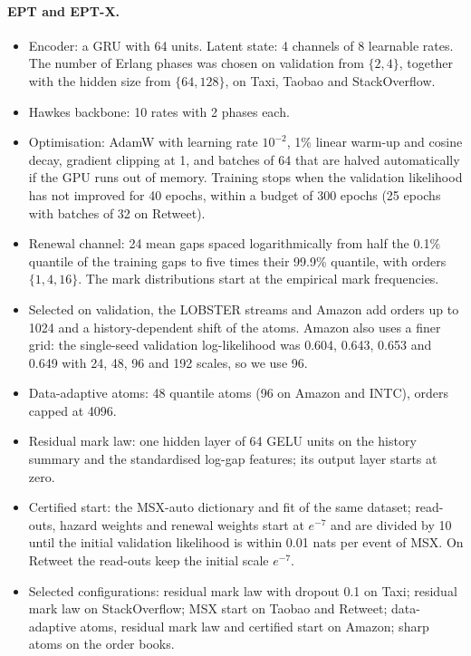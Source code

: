 \paragraph{EPT and EPT-X.}
\begin{itemize}
\item Encoder: a GRU with 64 units. Latent state: 4 channels of 8 learnable rates. The number of
Erlang phases was chosen on validation from $\{2,4\}$, together with the hidden size from
$\{64,128\}$, on Taxi, Taobao and StackOverflow.
\item Hawkes backbone: 10 rates with 2 phases each.
\item Optimisation: AdamW \citep{loshchilov2019decoupled} with learning rate $10^{-2}$, 1\% linear
warm-up and cosine decay, gradient clipping at 1, and batches of 64 that are halved automatically
if the GPU runs out of memory. Training stops when the validation likelihood has not improved for
40 epochs, within a budget of 300 epochs (25 epochs with batches of 32 on Retweet).
\item Renewal channel: 24 mean gaps spaced logarithmically from half the 0.1\% quantile of the
training gaps to five times their 99.9\% quantile, with orders $\{1,4,16\}$. The mark
distributions start at the empirical mark frequencies.
\item Selected on validation, the LOBSTER streams and Amazon add orders up to 1024 and a
history-dependent shift of the atoms. Amazon also uses a finer grid: the single-seed validation
log-likelihood was 0.604, 0.643, 0.653 and 0.649 with 24, 48, 96 and 192 scales, so we use 96.
\item Data-adaptive atoms: 48 quantile atoms (96 on Amazon and INTC), orders capped at 4096.
\item Residual mark law: one hidden layer of 64 GELU units on the history summary and the
standardised log-gap features; its output layer starts at zero.
\item Certified start: the MSX-auto dictionary and fit of the same dataset; read-outs, hazard
weights and renewal weights start at $e^{-7}$ and are divided by 10 until the initial validation
likelihood is within 0.01 nats per event of MSX. On Retweet the read-outs keep the initial scale
$e^{-7}$.
\item Selected configurations: residual mark law with dropout 0.1 on Taxi; residual mark law on
StackOverflow; MSX start on Taobao and Retweet; data-adaptive atoms, residual mark law and
certified start on Amazon; sharp atoms on the order books.
\end{itemize}

